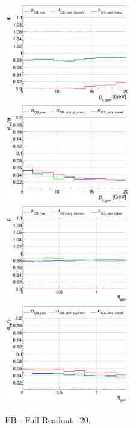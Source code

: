 \begin{figure}
\includegraphics[width=0.495\textwidth]{./plots_pdf/ECAL_plots/plotsPU/EB/FULL/pdf/GENPT/EBFULL_GENPT_0005_0020_MuOverBins.pdf}
\includegraphics[width=0.495\textwidth]{./plots_pdf/ECAL_plots/plotsPU/EB/FULL/pdf/GENPT/EBFULL_GENPT_0005_0020_EffSigmaOverBins.pdf}
\includegraphics[width=0.495\textwidth]{./plots_pdf/ECAL_plots/plotsPU/EB/FULL/pdf/GENETA/EBFULL_GENETA_0005_0020_MuOverBins.pdf}
\includegraphics[width=0.495\textwidth]{./plots_pdf/ECAL_plots/plotsPU/EB/FULL/pdf/GENETA/EBFULL_GENETA_0005_0020_EffSigmaOverBins.pdf}
\caption{EB - Full Readout --20\GeV.}
\end{figure}


